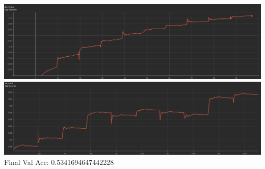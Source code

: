 \documentclass{article}
\begin{document}
\includegraphics[width=\textwidth]{q2.6_3.png}
\includegraphics[width=\textwidth]{q2.6_4.png}
Final Val Acc: 0.5341694647442228 \\
\end{document}
